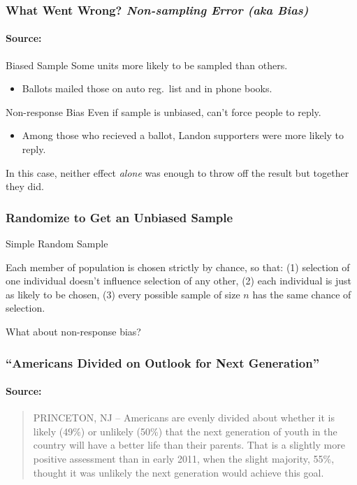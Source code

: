 \documentclass{beamer}
\begin{document}
\begin{frame}

\frametitle{What Went Wrong? \emph{Non-sampling Error (aka Bias)}}
\framesubtitle{Source: \href{http://www.jstor.org/stable/10.2307/2749114}{}}

\begin{block}{Biased Sample}
Some units more likely to be sampled than others.
	\begin{itemize}
		\item Ballots mailed those on auto reg.\ list and in phone books.
	\end{itemize}
\end{block}

\begin{block}{Non-response Bias}
Even if sample is unbiased, can't force people to reply.
	\begin{itemize}
		\item Among those who recieved a ballot, Landon supporters were more likely to reply.
	\end{itemize}
\end{block}
\alert{In this case, neither effect \emph{alone} was enough to throw off the result but together they did.}
\end{frame}
\begin{frame}
\frametitle{Randomize to Get an Unbiased Sample}

\begin{block}{Simple Random Sample}

Each member of population is chosen strictly by chance, so that: (1) selection of one individual doesn't influence selection of any other, (2) each individual is just as likely to be chosen, (3) every possible sample of size $n$ has the same chance of selection.

\end{block}

\begin{block}{What about non-response bias?}
\end{block}
\end{frame}

\begin{frame}
\frametitle{``Americans Divided on Outlook for Next Generation''}
\framesubtitle{Source: \href{http://www.gallup.com/poll/159737/americans-divided-outlook-next-generation.aspx}{}}
\vspace{1em}
\begin{quote}
PRINCETON, NJ -- Americans are evenly divided about whether it is likely (49\%) or unlikely (50\%) that the next generation of youth in the country will have a better life than their parents. That is a slightly more positive assessment than in early 2011, when the slight majority, 55\%, thought it was unlikely the next generation would achieve this goal.
\end{quote}
\end{frame}
\end{document}
